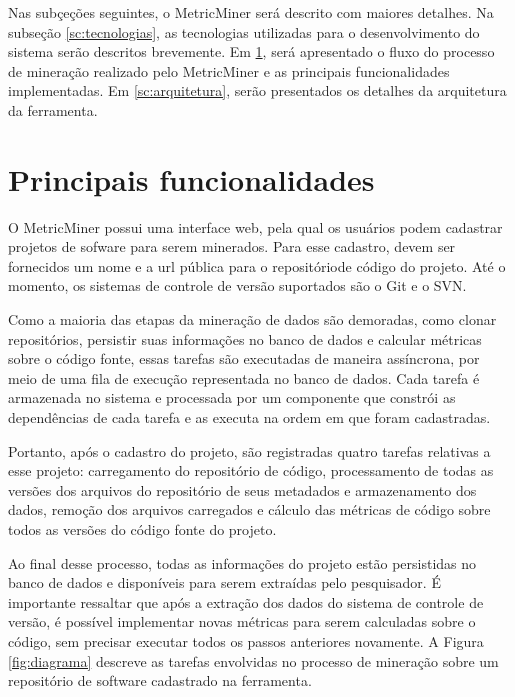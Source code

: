 \documentclass[a4paper, 12pt, twoside]{book}
\begin{document}
    Nas subçeções seguintes, o MetricMiner será descrito com maiores detalhes. Na subseção \ref{sc:tecnologias}, as tecnologias utilizadas para o desenvolvimento do sistema serão descritos brevemente. Em \ref{sc:abordagem}, será apresentado o fluxo do processo de mineração realizado pelo MetricMiner e as principais funcionalidades implementadas. Em \ref{sc:arquitetura}, serão presentados os detalhes da arquitetura da ferramenta.

    
    \section{Principais funcionalidades} \label{sc:abordagem}
        O MetricMiner possui uma interface web, pela qual os usuários podem cadastrar projetos de
        sofware para serem minerados. Para esse cadastro, devem ser fornecidos um nome e a url
        pública para o repositóriode código do projeto. Até o momento, os sistemas de controle de versão 
        suportados são o Git e o SVN.

        Como a maioria das etapas da mineração de dados são demoradas, como
        clonar repositórios, persistir suas informações no banco de dados e calcular métricas sobre o
        código fonte, essas tarefas são executadas de maneira assíncrona, por meio 
        de uma fila de execução representada no banco de dados. Cada tarefa é armazenada no sistema e 
        processada por um componente que constrói as dependências de cada tarefa e as executa na 
        ordem em que foram cadastradas.

        Portanto, após o cadastro do projeto, são registradas quatro tarefas relativas a esse 
        projeto: carregamento do repositório de código, processamento de todas as versões
        dos arquivos do repositório de seus metadados e armazenamento dos dados,
        remoção dos arquivos carregados e cálculo das métricas de código sobre todos
        as versões do código fonte do projeto.

        Ao final desse processo, todas as informações do projeto estão persistidas no banco de dados 
        e disponíveis para serem extraídas pelo pesquisador. É importante ressaltar que após a 
        extração dos dados do sistema de controle de versão, é possível implementar novas métricas 
        para serem calculadas sobre o código, sem precisar executar todos os passos anteriores 
        novamente. A Figura \ref{fig:diagrama} descreve as tarefas envolvidas no processo de 
        mineração sobre um repositório de software cadastrado na ferramenta.
\end{document}
